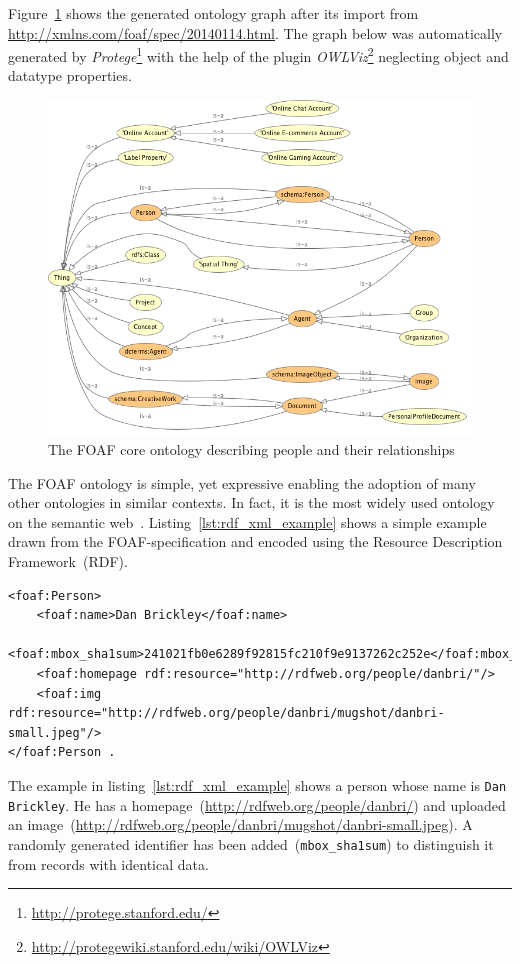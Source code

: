 \documentclass{article}
\begin{document}
Figure~\ref{fig:foaf-ontology} shows the generated ontology graph after its import from \url{http://xmlns.com/foaf/spec/20140114.html}.
The graph below was automatically generated by \textit{Protege}\footnote{\url{http://protege.stanford.edu/}} with the help of the plugin \textit{OWLViz}\footnote{\url{http://protegewiki.stanford.edu/wiki/OWLViz}} neglecting object and datatype properties.
\begin{figure}[H]
	\centering \includegraphics*[width=.8\columnwidth]{foaf-ontology.png}
	\caption{The FOAF core ontology describing people and their relationships}
	\label{fig:foaf-ontology}
\end{figure}
The FOAF ontology is simple, yet expressive enabling the adoption of many other ontologies in similar contexts. In fact, it is the most widely used ontology on the semantic web~\cite{article:social-networking}. Listing~\ref{lst:rdf_xml_example} shows a simple example drawn from the FOAF-specification and encoded using the Resource Description Framework~(RDF)\cite{article:rdf}.

\begin{lstlisting}[caption={RDF/XML representation of a person using the FOAF vocabulary},label={lst:rdf_xml_example}]
<foaf:Person>
	<foaf:name>Dan Brickley</foaf:name>
	<foaf:mbox_sha1sum>241021fb0e6289f92815fc210f9e9137262c252e</foaf:mbox_sha1sum>
	<foaf:homepage rdf:resource="http://rdfweb.org/people/danbri/"/>
	<foaf:img rdf:resource="http://rdfweb.org/people/danbri/mugshot/danbri-small.jpeg"/>
</foaf:Person .
\end{lstlisting}

The example in listing~\ref{lst:rdf_xml_example} shows a person whose name is \texttt{Dan Brickley}. He has a homepage~(\url{http://rdfweb.org/people/danbri/}) and uploaded an image~(\url{http://rdfweb.org/people/danbri/mugshot/danbri-small.jpeg}). A randomly generated identifier has been added~(\texttt{mbox\_sha1sum}) to distinguish it from records with identical data. 
\end{document}
